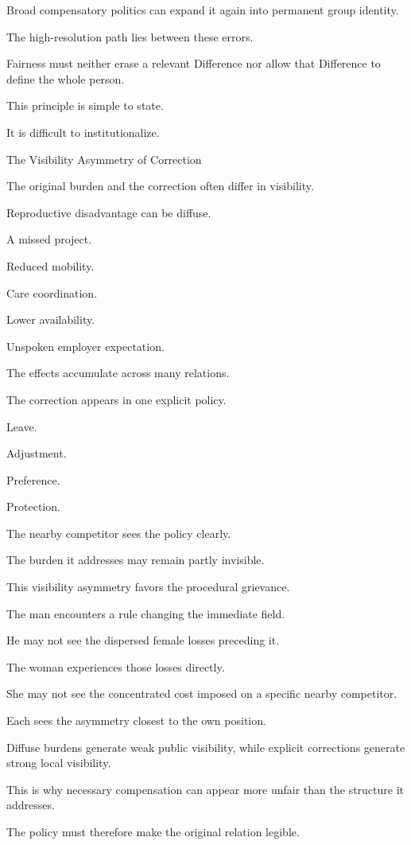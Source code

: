 Broad compensatory politics can expand it again into permanent group identity.

The high-resolution path lies between these errors.

Fairness must neither erase a relevant Difference nor allow that Difference to define the whole person.

This principle is simple to state.

It is difficult to institutionalize.

The Visibility Asymmetry of Correction

The original burden and the correction often differ in visibility.

Reproductive disadvantage can be diffuse.

A missed project.

Reduced mobility.

Care coordination.

Lower availability.

Unspoken employer expectation.

The effects accumulate across many relations.

The correction appears in one explicit policy.

Leave.

Adjustment.

Preference.

Protection.

The nearby competitor sees the policy clearly.

The burden it addresses may remain partly invisible.

This visibility asymmetry favors the procedural grievance.

The man encounters a rule changing the immediate field.

He may not see the dispersed female losses preceding it.

The woman experiences those losses directly.

She may not see the concentrated cost imposed on a specific nearby competitor.

Each sees the asymmetry closest to the own position.

Diffuse burdens generate weak public visibility, while explicit corrections generate strong local visibility.

This is why necessary compensation can appear more unfair than the structure it addresses.

The policy must therefore make the original relation legible.

